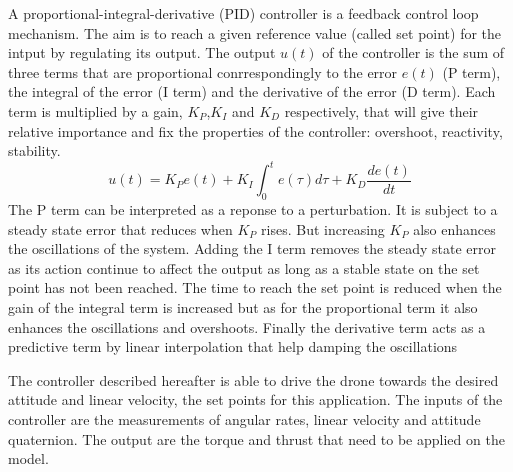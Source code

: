 A proportional-integral-derivative (PID) controller is a feedback control loop mechanism. The aim is to reach a given
reference value (called set point) for the intput by regulating its output. The output $u(t)$ of the controller is the
sum of three terms that are proportional conrrespondingly to the error $e(t)$ (P term), the integral of the error (I
term) and the derivative of the error (D term). Each term is multiplied by a gain, $K_P$,$K_I$ and $K_D$ respectively,
that will give their relative importance and fix the properties of the controller: overshoot, reactivity, stability.
\begin{equation}
	u(t) = K_P e(t) + K_I\int_0^t{e(\tau)d\tau} + K_D \frac{de(t)}{dt}
\end{equation}
The P term can be interpreted as a reponse to a perturbation. It is subject to a steady state error that reduces when
$K_P$ rises. But increasing $K_P$ also enhances the oscillations of the system. Adding the I term removes the steady
state error as its action continue to affect the output as long as a stable state on the set point has not been
reached. The time to reach the set point is reduced when the gain of the integral term is increased but as for the
proportional term it also enhances the oscillations and overshoots. Finally the derivative term acts as a predictive
term by linear interpolation that help damping the oscillations



The controller described hereafter is able to drive the drone towards the desired attitude and linear velocity, the set
points for this application. The inputs of the controller are the measurements of angular rates, linear velocity and
attitude quaternion. The output are the torque and thrust that need to be applied on the model.  

